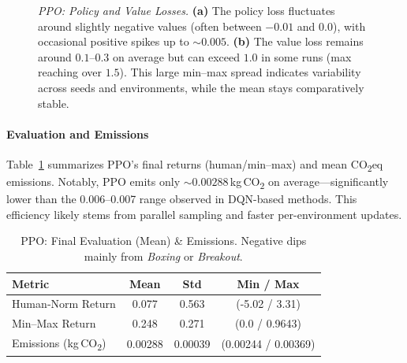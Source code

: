 \begin{figure} 
	\centering
	\quad
	\caption{\emph{PPO: Policy and Value Losses.}
		\textbf{(a)} The policy loss fluctuates around slightly negative values 
		(often between $-0.01$ and $0.0$), with occasional positive spikes up to $\sim0.005$. 
		\textbf{(b)} The value loss remains around $0.1$--$0.3$ on average but can exceed $1.0$ in some runs 
		(max reaching over $1.5$). This large min--max spread indicates variability across seeds and environments, 
		while the mean stays comparatively stable.}
	\label{fig:ppo_pol_val_losses}
\end{figure}

\paragraph{Evaluation and Emissions}
Table~\ref{tab:ppo_eval} summarizes PPO's final returns (human/min--max) and mean CO\textsubscript{2}eq emissions. 
Notably, PPO emits only $\sim0.00288$\,kg\,CO\textsubscript{2} on average—significantly lower than the 0.006--0.007 range observed in DQN-based methods. This efficiency likely stems from parallel sampling and faster per-environment updates.

\begin{table} 
	\caption{PPO: Final Evaluation (Mean) \& Emissions. Negative dips mainly from \emph{Boxing} or \emph{Breakout}.}
	\label{tab:ppo_eval}
	\centering
	\begin{tabular}{lccc}
		\toprule
		\textbf{Metric} & \textbf{Mean} & \textbf{Std} & \textbf{Min / Max}\\
		\midrule
		Human‐Norm Return & 0.077 & 0.563 & (-5.02 / 3.31)\\
		Min--Max Return   & 0.248 & 0.271 & (0.0 / 0.9643)\\
		Emissions (kg\,CO\textsubscript{2}) & 0.00288 & 0.00039 & (0.00244 / 0.00369)\\
		\bottomrule
	\end{tabular}
\end{table}

